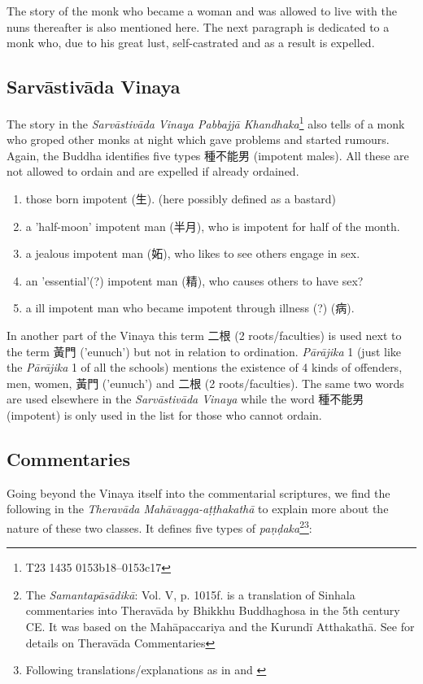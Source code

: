 The story of the monk who became a woman and was allowed to live with the nuns thereafter is also mentioned here. The next paragraph is dedicated to a monk who, due to his great lust, self-castrated and as a result is expelled.


\subsection{Sarvāstivāda Vinaya}
The story in the {\em Sarvāstivāda Vinaya Pabbajjā Khandhaka}\footnote{T23 1435 0153b18–0153c17} also tells of a monk who groped other monks at night which gave problems and started rumours. Again, the Buddha identifies five types 種不能男 (impotent males). All these are not allowed to ordain and are expelled if already ordained.

\begin{enumerate}
\item those born impotent (生). (here possibly defined as a bastard)
\item a 'half-moon' impotent man (半月), who is impotent for half of the month.
\item a jealous impotent man (妬), who likes to see others engage in sex.
\item an 'essential'(?) impotent man (精), who causes others to have sex?
\item a ill impotent man who became impotent through illness (?) (病).
\end{enumerate}

In another part of the Vinaya this term 二根 (2 roots/faculties) is used next to the term 黃門 ('eunuch') but not in relation to ordination. {\em Pārājika} 1 (just like the {\em Pārājika} 1 of all the schools) mentions the existence of 4 kinds of offenders, men, women, 黃門 ('eunuch') and 二根 (2 roots/faculties). The same two words are used elsewhere in the {\em Sarvāstivāda Vinaya} while the word 種不能男 (impotent) is only used in the list for those who cannot ordain.


\subsection{Commentaries}

Going beyond the Vinaya itself into the commentarial scriptures, we find the following in the {\em Theravāda Mahāvagga-aṭṭhakathā} to explain more about the nature of these two classes. It defines five types of {\em paṇḍaka}\footnote{The {\em Samantapāsādikā}: Vol. V, p. 1015f. is a translation of Sinhala commentaries into Theravāda by Bhikkhu Buddhaghosa in the 5th century CE. It was based on the Mahāpaccariya and the Kurundī Atthakathā. See \cite{goonesekere} for details on Theravāda Commentaries}\footnote{Following translations/explanations as in \cite{bomhard} and \cite{thanissaro}}:

